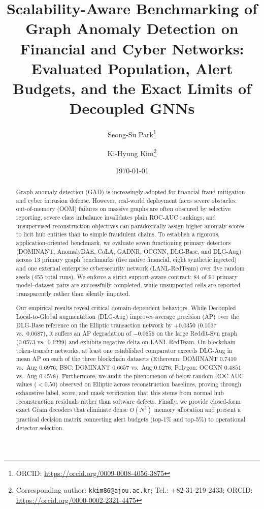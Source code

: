 \documentclass[11pt,a4paper]{article}
\title{\textbf{\Large Scalability-Aware Benchmarking of Graph Anomaly Detection on Financial and Cyber Networks: Evaluated Population, Alert Budgets, and the Exact Limits of Decoupled GNNs}}
\author[1]{Seong-Su Park\thanks{ORCID: \url{https://orcid.org/0009-0008-4056-3875}}}
\author[2]{Ki-Hyung Kim\thanks{Corresponding author: \texttt{kkim86@ajou.ac.kr}; Tel.: +82-31-219-2433; ORCID: \url{https://orcid.org/0000-0002-2321-4475}}}
\affil[1]{\small Department of Computer Engineering, Ajou University, Suwon 16499, Republic of Korea; \texttt{parky@ajou.ac.kr}}
\affil[2]{\small Department of Cyber Security, Ajou University, Suwon 16499, Republic of Korea; \texttt{kkim86@ajou.ac.kr}}
\date{\today}
\begin{document}
\maketitle

\begin{abstract}
Graph anomaly detection (GAD) is increasingly adopted for financial fraud mitigation and cyber intrusion defense. However, real-world deployment faces severe obstacles: out-of-memory (OOM) failures on massive graphs are often obscured by selective reporting, severe class imbalance invalidates plain ROC-AUC rankings, and unsupervised reconstruction objectives can paradoxically assign higher anomaly scores to licit hub entities than to simple fraudulent chains. To establish a rigorous, application-oriented benchmark, we evaluate seven functioning primary detectors (DOMINANT, AnomalyDAE, CoLA, GADNR, OCGNN, DLG-Base, and DLG-Aug) across 13 primary graph benchmarks (five native financial, eight synthetic injected) and one external enterprise cybersecurity network (LANL-RedTeam) over five random seeds (455 total runs). We enforce a strict support-aware contract: 84 of 91 primary model--dataset pairs are successfully completed, while unsupported cells are reported transparently rather than silently imputed. 

Our empirical results reveal critical domain-dependent behaviors. While Decoupled Local-to-Global augmentation (DLG-Aug) improves average precision (AP) over the DLG-Base reference on the Elliptic transaction network by $+0.0350$ (0.1037 vs.\ 0.0687), it suffers an AP degradation of $-0.0656$ on the large Reddit-Syn graph (0.0573 vs.\ 0.1229) and exhibits negative delta on LANL-RedTeam. On blockchain token-transfer networks, at least one established comparator exceeds DLG-Aug in mean AP on each of the three blockchain datasets (Ethereum: DOMINANT $0.7410$ vs.\ Aug $0.6976$; BSC: DOMINANT $0.6657$ vs.\ Aug $0.6276$; Polygon: OCGNN $0.4851$ vs.\ Aug $0.4578$). Furthermore, we audit the phenomenon of below-random ROC-AUC values ($<0.50$) observed on Elliptic across reconstruction baselines, proving through exhaustive label, score, and mask verification that this stems from normal hub reconstruction residuals rather than software defects. Finally, we provide closed-form exact Gram decoders that eliminate dense $O(N^2)$ memory allocation and present a practical decision matrix connecting alert budgets (top-1\% and top-5\%) to operational detector selection.
\end{abstract}

\par
\end{document}
